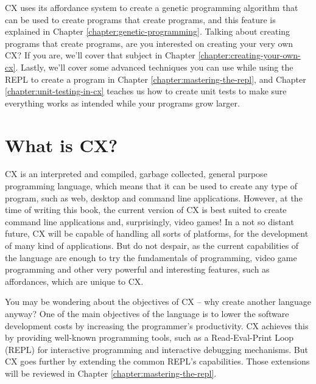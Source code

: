 \documentclass[11pt,fleqn,openany]{book} %
\begin{document}
CX uses its affordance system to create a genetic programming algorithm that can be used to create programs that create programs, and this feature is explained in Chapter \ref{chapter:genetic-programming}. Talking about creating programs that create programs, are you interested on creating your very own CX? If you are, we'll cover that subject in Chapter \ref{chapter:creating-your-own-cx}. Lastly, we'll cover some advanced techniques you can use while using the REPL to create a program in Chapter \ref{chapter:mastering-the-repl}, and Chapter \ref{chapter:unit-testing-in-cx} teaches us how to create unit tests to make sure everything works as intended while your programs grow larger.


\section{What is CX?}


CX is an interpreted and compiled, garbage collected, general purpose programming language, which means that it can be used to create any type of program, such as web, desktop and command line applications. However, at the time of writing this book, the current version of CX is best suited to create command line applications and, surprisingly, video games! In a not so distant future, CX will be capable of handling all sorts of platforms, for the development of many kind of applications. But do not despair, as the current capabilities of the language are enough to try the fundamentals of programming, video game programming and other very powerful and interesting features, such as affordances, which are unique to CX.

You may be wondering about the objectives of CX -- why create another language anyway? One of the main objectives of the language is to lower the software development costs by increasing the programmer's productivity. CX achieves this by providing well-known programming tools, such as a Read-Eval-Print Loop (REPL) for interactive programming and interactive debugging mechanisms. But CX goes further by extending the common REPL's capabilities. Those extensions will be reviewed in Chapter \ref{chapter:mastering-the-repl}.
\end{document}
